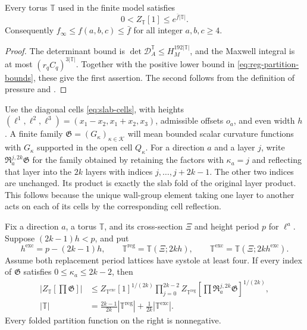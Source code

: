 \documentclass[11pt,letterpaper,reqno]{amsart}
\begin{document}
\begin{lemma}\label{lem:uniform-ceiling}
Every torus $\mathbb T$ used in the finite model satisfies
\[
 0<Z_{\mathbb T}[1]\le e^{\bar f|\mathbb T|}.
\]
Consequently $f_\infty\le f(a,b,c)\le\bar f$ for all integer
$a,b,c\ge4$.
\end{lemma}

\begin{proof}
The determinant bound is $\det\mathcal D_A^{\mathbb T}
\le H_M^{192|\mathbb T|}$, and the Maxwell integral is at most
$(r_qC_q)^{3|\mathbb T|}$. Together with the positive lower bound
in \eqref{eq:reg-partition-bounds}, these give the first assertion.
The second follows from the definition of pressure and
.
\end{proof}

Use the diagonal cells \eqref{eq:slab-cells}, with heights
$(\ell^1,\ell^2,\ell^3)=(x_1-x_2,x_1+x_2,x_3)$, admissible
offsets $o_a$, and even width $h$. A finite family
$\mathfrak G=(G_\kappa)_{\kappa\in\mathcal K}$ will mean bounded
scalar curvature functions with $G_\kappa$ supported in the open
cell $Q_\kappa$. For a direction $a$ and a layer $j$, write
$\mathfrak R_a^{j,2k}\mathfrak G$ for the family obtained by retaining
the factors with $\kappa_a=j$ and reflecting that layer into the
$2k$ layers with indices $j,\ldots,j+2k-1$. The other two indices
are unchanged. Its product is exactly the slab fold of the original
layer product. This follows because the unique wall-group element
taking one layer to another acts on each of its cells by the
corresponding cell reflection.

\begin{lemma}\label{lem:one-step}
Fix a direction $a$, a torus $\mathbb T$, and its cross-section $\Xi$
and height period $p$ for $\ell^a$. Suppose $(2k-1)h<p$, and put
\[
 h^{\mathrm{exc}}=p-(2k-1)h,\qquad
 \mathbb T^{\mathrm{reg}}=\mathbb T(\Xi;2kh),\qquad
 \mathbb T^{\mathrm{exc}}=\mathbb T(\Xi;2kh^{\mathrm{exc}}).
\]
Assume both replacement period lattices have systole at least four.
If every index of $\mathfrak G$ satisfies $0\le\kappa_a\le2k-2$,
then
\begin{align}
 \left|Z_{\mathbb T}[\prod\mathfrak G]\right|
 &\le Z_{\mathbb T^{\mathrm{exc}}}[1]^{1/(2k)}
    \prod_{j=0}^{2k-2}
      Z_{\mathbb T^{\mathrm{reg}}}
       [\prod\mathfrak R_a^{j,2k}\mathfrak G]^{1/(2k)},
       \label{eq:sides-step}\\
 |\mathbb T|
 &=\frac{2k-1}{2k}|\mathbb T^{\mathrm{reg}}|
     +\frac1{2k}|\mathbb T^{\mathrm{exc}}|.
       \label{eq:sides-step-volumes}
\end{align}
Every folded partition function on the right is nonnegative.
\end{lemma}
\end{document}
